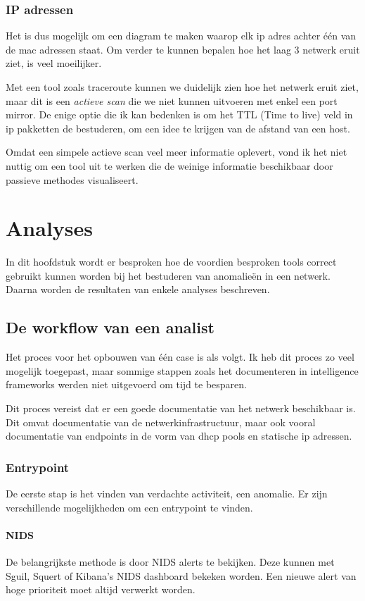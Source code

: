 \documentclass[a4paper, 12pt]{report}
\begin{document}
\subsection{IP adressen}
Het is dus mogelijk om een diagram te maken waarop elk ip adres achter één van de mac adressen staat.
Om verder te kunnen bepalen hoe het laag 3 netwerk eruit ziet, is veel moeilijker.

Met een tool zoals traceroute kunnen we duidelijk zien hoe het netwerk eruit ziet, maar dit is een \emph{actieve scan} die we niet kunnen uitvoeren met enkel een port mirror.
De enige optie die ik kan bedenken is om het TTL (Time to live) veld in ip pakketten de bestuderen, om een idee te krijgen van de afstand van een host.

Omdat een simpele actieve scan veel meer informatie oplevert, vond ik het niet nuttig om een tool uit te werken die de weinige informatie beschikbaar door passieve methodes visualiseert.

\chapter{Analyses}
In dit hoofdstuk wordt er besproken hoe de voordien besproken tools correct gebruikt kunnen worden bij het bestuderen van anomalieën in een netwerk.
Daarna worden de resultaten van enkele analyses beschreven.

\section{De workflow van een analist}
Het proces voor het opbouwen van één case is als volgt.
Ik heb dit proces zo veel mogelijk toegepast, maar sommige stappen zoals het documenteren in intelligence frameworks werden niet uitgevoerd om tijd te besparen.

Dit proces vereist dat er een goede documentatie van het netwerk beschikbaar is.
Dit omvat documentatie van de netwerkinfrastructuur, maar ook vooral documentatie van endpoints in de vorm van dhcp pools en statische ip adressen.

\subsection{Entrypoint}
De eerste stap is het vinden van verdachte activiteit, een anomalie.
Er zijn verschillende mogelijkheden om een entrypoint te vinden.

\subsubsection{NIDS}
De belangrijkste methode is door NIDS alerts te bekijken.
Deze kunnen met Sguil, Squert of Kibana's NIDS dashboard bekeken worden.
Een nieuwe alert van hoge prioriteit moet altijd verwerkt worden.
\end{document}
